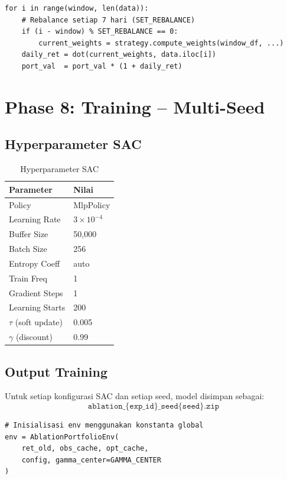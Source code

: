 \documentclass[12pt,a4paper]{article}
\begin{document}
\begin{lstlisting}[caption={Pseudocode Backtest}]
for i in range(window, len(data)):
    # Rebalance setiap 7 hari (SET_REBALANCE)
    if (i - window) % SET_REBALANCE == 0:
        current_weights = strategy.compute_weights(window_df, ...)
    daily_ret = dot(current_weights, data.iloc[i])
    port_val  = port_val * (1 + daily_ret)
\end{lstlisting}

\section{Phase 8: Training -- Multi-Seed}

\subsection{Hyperparameter SAC}

\begin{table}[h!]
\centering
\begin{tabular}{@{}ll@{}}
\toprule
\textbf{Parameter} & \textbf{Nilai} \\
\midrule
Policy           & MlpPolicy \\
Learning Rate    & $3 \times 10^{-4}$ \\
Buffer Size      & 50,000 \\
Batch Size       & 256 \\
Entropy Coeff    & auto \\
Train Freq       & 1 \\
Gradient Steps   & 1 \\
Learning Starts  & 200 \\
$\tau$ (soft update) & 0.005 \\
$\gamma$ (discount) & 0.99 \\
\bottomrule
\end{tabular}
\caption{Hyperparameter SAC}
\end{table}

\subsection{Output Training}

Untuk setiap konfigurasi SAC dan setiap seed, model disimpan sebagai:
\[
  \texttt{ablation\_\{exp\_id\}\_seed\{seed\}.zip}
\]

\begin{lstlisting}[caption={Instansiasi Env dengan GAMMA\_CENTER}]
# Inisialisasi env menggunakan konstanta global
env = AblationPortfolioEnv(
    ret_old, obs_cache, opt_cache, 
    config, gamma_center=GAMMA_CENTER
)
\end{lstlisting}
\end{document}
